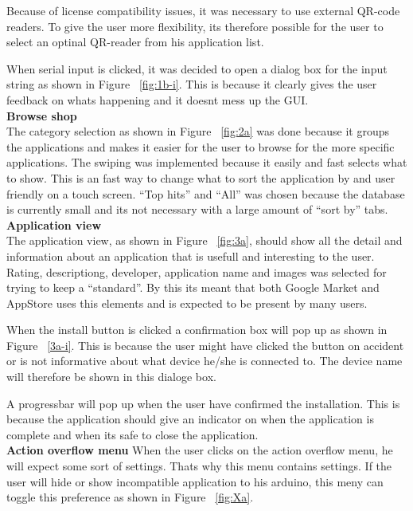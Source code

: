 	Because of license compatibility issues, it was necessary to use external QR-code readers. To give the user more flexibility, its therefore possible for the user to select an optinal QR-reader from his application list.

	When serial input is clicked, it was decided to open a dialog box for the input string as shown in Figure ~\ref{fig:1b-i}. This is because it clearly gives the user feedback on whats happening and it doesnt mess up the GUI.\\

	\textbf{Browse shop}\\
	The category selection as shown in Figure ~\ref{fig:2a} was done because it groups the applications and makes it easier for the user to browse for the more specific applications. The swiping was implemented because it easily and fast selects what to show. This is an fast way to change what to sort the application by and user friendly on a touch screen. ``Top hits'' and ``All'' was chosen because the database is currently small and its not necessary with a large amount of ``sort by'' tabs.\\

	\textbf{Application view}\\
	The application view, as shown in Figure ~\ref{fig:3a}, should show all the detail and information about an application that is usefull and interesting to the user. Rating, descriptiong, developer, application name and images was selected for trying to keep a ``standard''. By this its meant that both Google Market and AppStore uses this elements and is expected to be present by many users.

	When the install button is clicked a confirmation box will pop up as shown in Figure ~\ref{3a-i}. This is because the user might have clicked the button on accident or is not informative about what device he/she is connected to. The device name will therefore be shown in this dialoge box.

	A progressbar will pop up when the user have confirmed the installation. This is because the application should give an indicator on when the application is complete and when its safe to close the application. \\

	\textbf{Action overflow menu}
	When the user clicks on the action overflow menu, he will expect some sort of settings. Thats why this menu contains settings. If the user will hide or show incompatible application to his arduino, this meny can toggle this preference as shown in Figure ~\ref{fig:Xa}.\\

